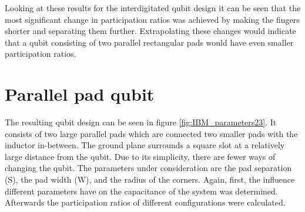 Looking at these results for the interdigitated qubit design it can be seen that the most significant change in participation ratios was achieved by making the fingers shorter and separating them further. Extrapolating these changes would indicate that a qubit consisting of two parallel rectangular pads would have even smaller participation ratios.


\clearpage
\section{Parallel pad qubit}
The resulting qubit design can be seen in figure \ref{fig:IBM_parameters23}. It consists of two large parallel pads which are connected two smaller pads with the inductor in-between. The ground plane surrounds a square slot at a relatively large distance from the qubit. Due to its simplicity, there are fewer ways of changing the qubit. The parameters under consideration are the pad separation (S), the pad width (W), and the radius of the corners. Again, first, the influence different parameters have on the capacitance of the system was determined. Afterwards the participation ratios of different configurations were calculated.

